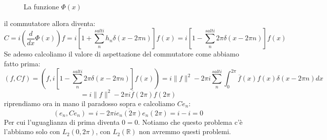 \documentclass[12pt]{book}
\theoremstyle{plain}
\newcommand{\R}{\mathbb{R}}
\newcommand{\x}{\mathbf{x}}
\theoremstyle{definition}
\theoremstyle{remark}
\begin{document}
\begin{figure}[H]
\centering
{}
\caption{La funzione $\Phi(x)$}
\end{figure}
il commutatore allora diventa:
\[C = i \left(\frac{d}{dx}\Phi(x)\right)f = i\left[1+\sum_n^{salti}h_n\delta(x-2\pi n)\right]f(x) =i\left[1-\sum_n^{salti}2\pi\delta(x-2\pi n)\right]f(x) \]
Se adesso calcoliamo il valore di aspettazione del commutatore come abbiamo fatto prima:
\[(f,Cf) = (f,i\left[1-\sum_n^{salti}2\pi\delta(x-2\pi n)\right]f(x)) = i\|f\|^2 - 2\pi i \sum_n^{salti}\int_0^{2\pi} \overline{f}(x)f(x)\delta(x-2\pi n )dx\]
\[ = i\|f\|^2 -2\pi i \overline{f}(2\pi)f(2\pi) \]
riprendiamo ora in mano il paradosso sopra e calcoliamo $Ce_n$:
\[(e_n,Ce_n) = i -2\pi i\overline{e_n(2\pi)}e_n(2\pi) = i-i = 0 \]
Per cui l'uguaglianza di prima diventa $0=0$. Notiamo che questo problema c'è l'abbiamo solo con $L_2(0,2\pi)$, con $L_2(\R)$ non avremmo questi problemi.
\end{document}
